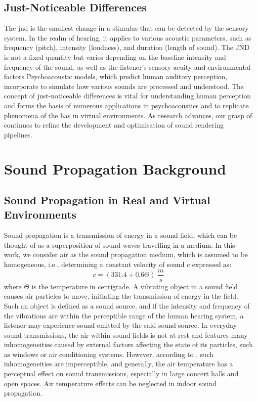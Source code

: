 \subsection{Just-Noticeable Differences}
The \acrfull{jnd} is the smallest change in a stimulus that can be detected by the sensory system. In the realm of hearing, it applies to various acoustic parameters, such as frequency (pitch), intensity (loudness), and duration (length of sound). The JND is not a fixed quantity but varies depending on the baseline intensity and frequency of the sound, as well as the listener's sensory acuity and environmental factors \citep{dolhasz2021perceptually}
Psychoacoustic models, which predict human auditory perception, incorporate  to simulate how various sounds are processed and understood.  The concept of just-noticeable differences is vital for understanding human perception and forms the basis of numerous applications in psychoacoustics and to replicate phenomena of the \acrshort{has} in virtual environments. As research advances, our grasp of  continues to refine the development and optimisation of sound rendering pipelines.

\section{Sound Propagation Background}
\subsection{Sound Propagation in Real and Virtual Environments}
Sound propagation is a transmission of energy in a sound field, which can be thought of as a superposition of sound waves travelling in a medium. In this work, we consider air as the sound propagation medium, which is assumed to be homogeneous, i.e., determining a constant velocity of sound $c$ expressed as: 
\begin{equation}
c = (331.4 + 0.6\Theta)~\frac{m}{s}   
\end{equation}
where $\Theta$ is the temperature in centigrade.
A vibrating object in a sound field causes air particles to move, initiating the transmission of energy in the field. Such an object is defined as a sound source, and if the intensity and frequency of the vibrations are within the perceptible range of the human hearing system, a listener may experience sound emitted by the said sound source.
In everyday sound transmissions, the air within sound fields is not at rest and features many inhomogeneities caused by external factors affecting the state of its particles, such as windows or air conditioning systems. However, according to \citep{kuttruff2016room}, such inhomogeneities are imperceptible, and generally, the air temperature has a perceptual effect on sound transmissions, especially in large concert halls and open spaces. Air temperature effects can be neglected in indoor sound propagation.


